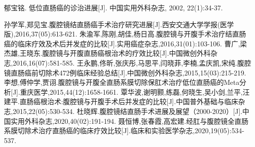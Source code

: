 \documentclass[a4paper,11pt,onecolumn,twoside]{article}
\begin{document}
\begin{multicols}{2}
\begin{thebibliography}{14}
        郁宝铭. 低位直肠癌的诊治进展[J]. 中国实用外科杂志, 2002, 22(1):34-37.

        孙学军,郑见宝.腹腔镜结直肠癌手术治疗研究进展[J].西安交通大学学报(医学版),2016,37(05):613-621.
        朱渝军,陈刚,胡佳,杨日高.腹腔镜与开腹手术治疗结直肠癌的临床疗效及术后并发症的比较[J].实用癌症杂志,2016,31(01):103-106.
        曹广,梁杰雄,王晓东.腹腔镜与开腹直肠癌根治术的疗效比较[J].中国微创外科杂志,2016,16(07):581-585.
        王永鹏,佟昕,张庆彤,马思平,闫晓菲,李楠,孟庆凯,宋纯.腹腔镜直肠癌前切除术472例临床经验总结[J].中国微创外科杂志,2015,15(03):215-219.
        李想,傅仲学,贾诩.腹腔镜与开腹全直肠系膜切除保肛术治疗低位直肠癌的Meta分析[J].重庆医学,2015,44(12):1658-1661.
        覃华波,谢明颢,练磊,何晓生,吴小剑,兰平,汪建平.直肠癌根治术:腹腔镜与开腹手术后并发症的比较[J].中国普外基础与临床杂志,2015,22(05):530-534.
        杜晓辉.腹腔镜结直肠手术进展及展望（2000-2020）[J].中国实用外科杂志,2020,40(02):191-194.
        聂恒博,张春霞,高宏建.经肛与腹腔镜全直肠系膜切除术治疗直肠癌的临床疗效比较[J].临床和实验医学杂志,2020,19(05):534-537.

    \end{thebibliography}
    \normalsize

\end{multicols}


\clearpage
\end{document}
